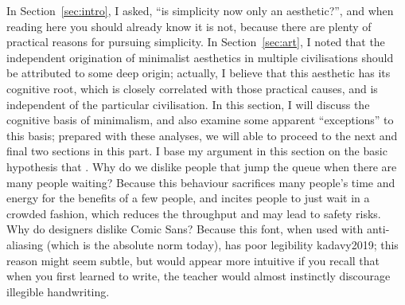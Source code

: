 In Section~\ref{sec:intro}, I asked, ``is simplicity now only an aesthetic?'',
and when reading here you should already know it is not, because there are
plenty of practical reasons for pursuing simplicity.  In Section~\ref{sec:art},
I noted that the independent origination of minimalist aesthetics in multiple
civilisations should be attributed to some deep origin; actually, I believe
that this aesthetic has its cognitive root, which is closely correlated with
those practical causes, and is independent of the particular civilisation.
In this section, I will discuss the cognitive basis of minimalism, and also
examine some apparent ``exceptions'' to this basis; prepared with these
analyses, we will able to proceed to the next and final two sections
in this part.  I base my argument in this section on the basic hypothesis
that .  Why do we dislike people that jump the queue when
there are many people waiting?  Because this behaviour sacrifices many people's
time and energy for the benefits of a few people, and incites people to just
wait in a crowded fashion, which reduces the throughput and may lead to safety
risks.  Why do designers dislike Comic Sans?  Because this font, when used with
anti-aliasing (which is the absolute norm today), has poor legibility\cupercite%
{kadavy2019}; this reason might seem subtle, but would appear more intuitive
if you recall that when you first learned to write, the teacher would
almost instinctly discourage illegible handwriting.

